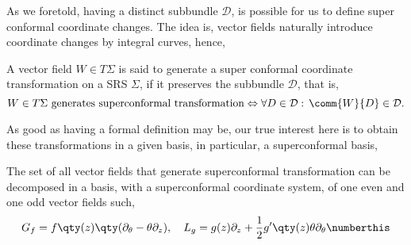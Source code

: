 As we foretold, having a distinct subbundle $\mathcal D$, is possible for us to define super conformal 
coordinate changes. The idea is, vector fields naturally introduce coordinate changes by integral curves, 
hence,
\begin{definition}
    A vector field $W\in T\Sigma$ is said to generate a super conformal coordinate transformation on a 
    SRS $\Sigma$, if it preserves the subbundle $\mathcal D$, that is, 
    $$W\in T\Sigma \textnormal{ generates superconformal transformation}\Leftrightarrow\forall D\in\mathcal D:\, \comm{W}{D}\in\mathcal D.$$
\end{definition}
As good as having a formal definition may be, our true interest here is to obtain these transformations in a given basis, 
in particular, a superconformal basis,
\begin{lemma}\label{lemma:basissuperconformal}
    The set of all vector fields that generate superconformal transformation can be decomposed in a basis, 
    with a superconformal coordinate system, of one even and one odd vector fields such, 
    \[G_f=f\qty(z)\qty(\partial_\theta-\theta\partial_z),\ \ \ L_g=g(z)\partial_z+\frac12 g'\qty(z)\theta\partial_\theta\numberthis\label{nsgenerators}\]
\end{lemma}
